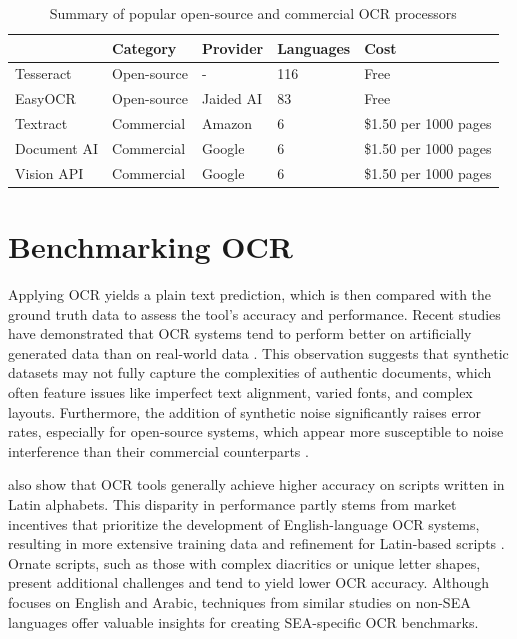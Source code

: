 \documentclass[12pt,oneside]{memoir}
\begin{document}
\begin{table}[ht]
    \centering
    \begin{tabular}{lllll}
        \toprule
        & Category & Provider & Languages & Cost\\
        \midrule
        Tesseract & Open-source & - & 116 & Free\\
        EasyOCR & Open-source & Jaided AI & 83 & Free\\
        Textract & Commercial & Amazon & 6 & \$1.50 per 1000 pages \\
        Document AI & Commercial & Google & 6 & \$1.50 per 1000 pages\\
        Vision API & Commercial & Google & 6 & \$1.50 per 1000 pages\\
        \bottomrule
    \end{tabular}
    \caption{Summary of popular open-source and commercial OCR processors}
   \label{table:summary-of-ocr-processors}
\end{table}

\section{Benchmarking OCR}
Applying OCR yields a plain text prediction, which is then compared with the ground truth data to assess the tool’s accuracy and performance.
Recent studies have demonstrated that OCR systems tend to perform better on artificially generated data than on real-world data \parencite{ignat-etal-2022}.
This observation suggests that synthetic datasets may not fully capture the complexities of authentic documents, which often feature issues like imperfect text alignment, varied fonts, and complex layouts.
Furthermore, the addition of synthetic noise significantly raises error rates, especially for open-source systems, which appear more susceptible to noise interference than their commercial counterparts \parencite{hegghammer-2022}.

\textcite{ignat-etal-2022} also show that OCR tools generally achieve higher accuracy on scripts written in Latin alphabets.
This disparity in performance partly stems from market incentives that prioritize the development of English-language OCR systems, resulting in more extensive training data and refinement for Latin-based scripts \parencite{hegghammer-2022}. 
Ornate scripts, such as those with complex diacritics or unique letter shapes, present additional challenges and tend to yield lower OCR accuracy.
Although \textcite{hegghammer-2022} focuses on English and Arabic, techniques from similar studies on non-SEA languages offer valuable insights for creating SEA-specific OCR benchmarks.
\end{document}
